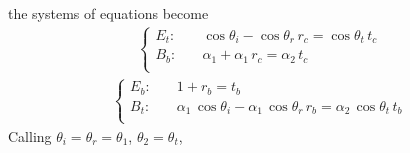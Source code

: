 \documentclass[letterpaper,10pt,italian]{jupyterBook}
\begin{document}
\sphinxAtStartPar
the systems of equations become
\begin{equation*}
\begin{split}\begin{cases}
 E_t: & \quad  \cos \theta_i -  \cos \theta_r \, r_c = \cos \theta_{t} \, t_c \\
 B_b: & \quad  \alpha_1      +  \alpha_1      \, r_c =  \alpha_2       \, t_c \\
\end{cases}\end{split}
\end{equation*}\begin{equation*}
\begin{split}\begin{cases}
 E_b: & \quad                          1 +                   r_b =  t_b \\
 B_t: & \quad  \alpha_1 \, \cos \theta_i -  \alpha_1 \, \cos \theta_r \, r_b = \alpha_2 \, \cos \theta_{t} \, t_b \\
\end{cases}\end{split}
\end{equation*}
\sphinxAtStartPar
Calling \(\theta_i = \theta_r = \theta_1\), \(\theta_2 = \theta_t\),
\end{document}
